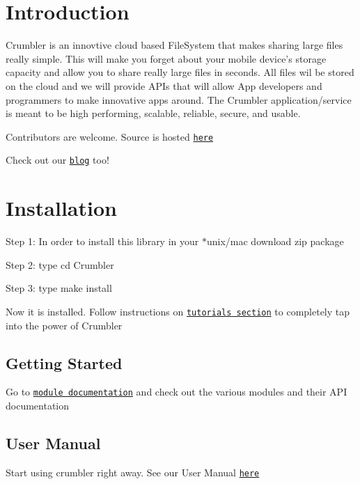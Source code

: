 \hypertarget{index_intro_sec}{}\section{Introduction}\label{index_intro_sec}
Crumbler is an innovtive cloud based File\-System that makes sharing large files really simple. This will make you forget about your mobile device's storage capacity and allow you to share really large files in seconds. All files wil be stored on the cloud and we will provide A\-P\-Is that will allow App developers and programmers to make innovative apps around. The Crumbler application/service is meant to be high performing, scalable, reliable, secure, and usable.\par
 Contributors are welcome. Source is hosted \href{https://github.com/sidharthamani/Crumbler}{\tt here} \par
 Check out our \href{http://sidharthamani.com}{\tt blog} too! \hypertarget{index_install_sec}{}\section{Installation}\label{index_install_sec}
Step 1\-: In order to install this library in your $\ast$unix/mac download zip package \par
 Step 2\-: type cd Crumbler \par
 Step 3\-: type make install \par
 Now it is installed. Follow instructions on \href{#}{\tt tutorials section} to completely tap into the power of Crumbler \hypertarget{index_xyz}{}\subsection{Getting Started}\label{index_xyz}
Go to \href{http://crumbler.sidharthamani.com/modules.html}{\tt module documentation} and check out the various modules and their A\-P\-I documentation \par
 \hypertarget{index_ayz}{}\subsection{User Manual}\label{index_ayz}
Start using crumbler right away. See our User Manual \href{#}{\tt here} \par
 
